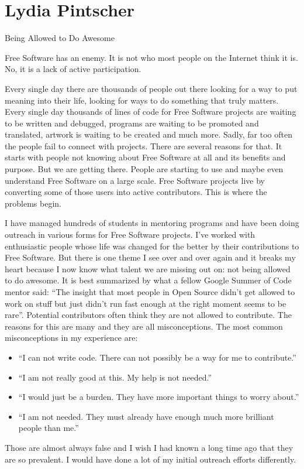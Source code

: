 
\chapter{Lydia Pintscher}{Being Allowed to Do Awesome}

Free Software has an enemy. It is not who most people on the Internet think it
is. No, it is a lack of active participation.

Every single day there are thousands of people out there looking for a way to
put meaning into their life, looking for ways to do something that truly
matters. Every single day thousands of lines of code for Free Software projects
are waiting to be written and debugged, programs are waiting to be promoted and
translated, artwork is waiting to be created and much more. Sadly, far too often
the people fail to connect with projects. There are several reasons for
that. It starts with people not knowing about Free Software at all and its
benefits and purpose. But we are getting there. People are starting to use and
maybe even understand Free Software on a large scale. Free Software projects
live by converting some of those users into active contributors. This is where
the problems begin.

I have managed hundreds of students in mentoring programs and have been doing
outreach in various forms for Free Software projects. I've worked with
enthusiastic people whose life was changed for the better by their contributions
to Free Software. But there is one theme I see over and over again and it breaks
my heart because I now know what talent we are missing out on: not being allowed
to do awesome. It is best summarized by what a fellow Google Summer of Code
mentor said: ``The insight that most people in Open Source didn’t get allowed to
work on stuff but just didn’t run fast enough at the right moment seems to be
rare''. Potential contributors often think they are not allowed to contribute.
The reasons for this are many and they are all misconceptions. The most common
misconceptions in my experience are:
\begin{itemize}
 \item ``I can not write code. There can not possibly be a way for me to
contribute.''
 \item ``I am not really good at this. My help is not needed.''
 \item ``I would just be a burden. They have more important things to worry
about.''
 \item ``I am not needed. They must already have enough much more brilliant
people than me.''
\end{itemize}
Those are almost always false and I wish I had known a long time ago that they
are so prevalent. I would have done a lot of my initial outreach efforts
differently.

